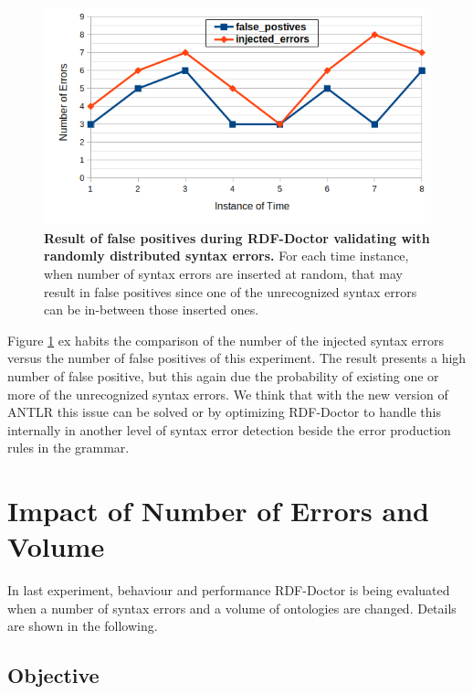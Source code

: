 	\begin{figure}[ht]
	\begin{center}
		\includegraphics[scale=0.7,angle=0]{images/Experiment02-03.png}
				\setlength\belowcaptionskip{-5mm}

		\caption{\textbf{Result of false positives during RDF-Doctor validating with randomly distributed syntax errors.} For each time instance, when number of syntax errors are inserted at random, that may result in false positives since one of the unrecognized syntax errors can be in-between those inserted ones.} 
		\label{Fig:Experiment02-03}
				\setlength\belowcaptionskip{-5mm}
		\setlength\abovecaptionskip{0mm}
	\end{center}
\end{figure}
Figure \ref{Fig:Experiment02-03} ex habits the comparison of the number of the injected syntax errors versus the number of false positives of this experiment. The result presents a high number of false positive, but this again due the probability of existing one or more of the unrecognized syntax errors. We think that with the new version of ANTLR this issue can be solved or by optimizing RDF-Doctor to handle this internally in another level of syntax error detection beside the error production rules in the grammar. 


\section{Impact of Number of Errors and Volume}
In last experiment, behaviour and  performance RDF-Doctor is being evaluated when a number of syntax errors and a volume of ontologies are changed. Details are shown in the following.  
\subsection{Objective}

